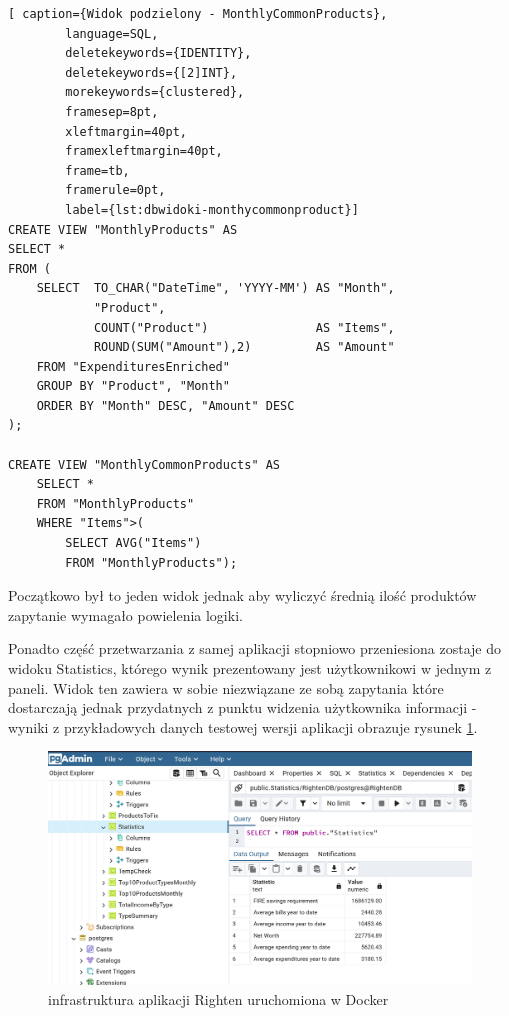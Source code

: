 \documentclass[a4paper,10pt, twoside]{report}
\begin{document}
\begin{large}
\begin{minipage}{\textwidth}
    \begin{lstlisting}[ caption={Widok podzielony - MonthlyCommonProducts},
        language=SQL,
        deletekeywords={IDENTITY},
        deletekeywords={[2]INT},
        morekeywords={clustered},
        framesep=8pt,
        xleftmargin=40pt,
        framexleftmargin=40pt,
        frame=tb,
        framerule=0pt,
        label={lst:dbwidoki-monthycommonproduct}]
CREATE VIEW "MonthlyProducts" AS
SELECT *
FROM (
    SELECT  TO_CHAR("DateTime", 'YYYY-MM') AS "Month",
            "Product",
            COUNT("Product")               AS "Items", 
            ROUND(SUM("Amount"),2)         AS "Amount"
    FROM "ExpendituresEnriched"
    GROUP BY "Product", "Month"
    ORDER BY "Month" DESC, "Amount" DESC
);

CREATE VIEW "MonthlyCommonProducts" AS
    SELECT *
    FROM "MonthlyProducts" 
    WHERE "Items">(
        SELECT AVG("Items")
        FROM "MonthlyProducts");\end{lstlisting}
{Początkowo był to jeden widok jednak aby wyliczyć średnią ilość produktów 
zapytanie wymagało powielenia logiki.}
\end{minipage}

{Ponadto część przetwarzania z samej aplikacji stopniowo przeniesiona zostaje do
 widoku Statistics, którego wynik prezentowany jest użytkownikowi w jednym z 
paneli. Widok ten zawiera w sobie niezwiązane ze sobą zapytania które 
dostarczają jednak przydatnych z punktu widzenia użytkownika informacji - 
wyniki z przykładowych danych testowej wersji aplikacji obrazuje rysunek 
\ref*{fig:dbwidoki-statistics}.}

\begin{figure}[H]           %
    \centering
    \includegraphics[width=12cm]{figures/RightenDB_views_statistics.png}
    \caption{infrastruktura aplikacji Righten uruchomiona w Docker}
    \label{fig:dbwidoki-statistics}
\end{figure}


\end{large}
\end{document}

